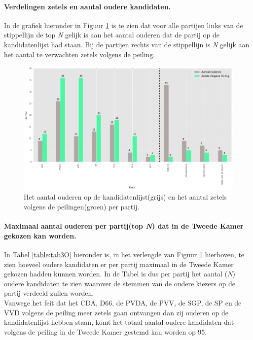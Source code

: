  
\paragraph{Verdelingen zetels en aantal oudere kandidaten.}
In de grafiek hieronder in Figuur \ref{fig:zetelsO} is te zien dat voor alle partijen links van de stippellijn de top \textit{N} gelijk is aan het aantal ouderen dat de partij op de kandidatenlijst had staan. Bij de partijen rechts van de stippellijn is \textit{N} gelijk aan het aantal te verwachten zetels volgens de peiling. 

 
\begin{figure}[H]

	\includegraphics[width=0.98\linewidth]	{Aantal_ouderen_aantal_zetels1.png}

			\caption{Het aantal ouderen op de kandidatenlijst(grijs) en het aantal zetels volgens de peilingen(groen) per partij.}

\label{fig:zetelsO}
\end{figure}

\paragraph{Maximaal aantal ouderen per partij(top \textit{N}) dat in de Tweede Kamer gekozen kan worden.}
In Tabel \ref{table:tab3O} hieronder is, in het verlengde van Figuur \ref{fig:zetelsO} hierboven, te zien hoeveel oudere kandidaten er per partij maximaal in de Tweede Kamer gekozen hadden kunnen worden. In de Tabel is dus per partij het aantal (\textit{N}) oudere kandidaten te zien waarover de stemmen van de oudere kiezers op de partij verdeeld zullen worden.  
\\
\indent Vanwege het feit dat het CDA, D66, de PVDA, de PVV, de SGP, de SP en de VVD volgens de peiling meer zetels gaan ontvangen dan zij ouderen op de kandidatenlijst hebben staan, komt het totaal aantal oudere kandidaten dat volgens de peiling in de Tweede Kamer gestemd kan worden op 95.




